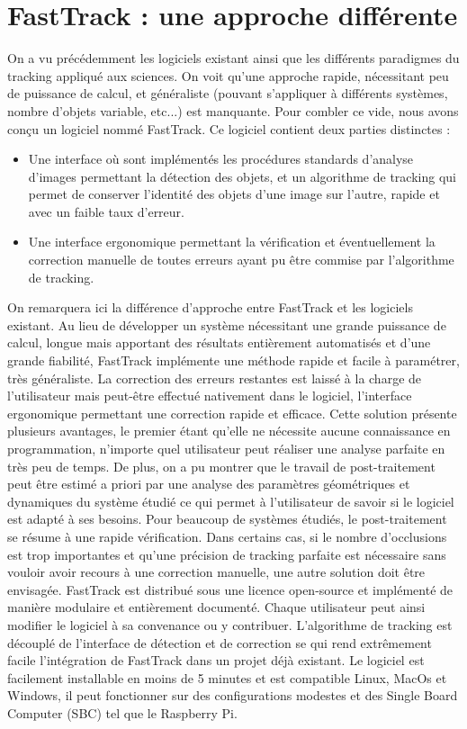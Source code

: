 	\section{FastTrack : une approche différente}
  On a vu précédemment les logiciels existant ainsi que les différents paradigmes du tracking appliqué aux sciences. On voit qu'une approche rapide, nécessitant peu de puissance de calcul, et généraliste (pouvant s'appliquer à différents systèmes, nombre d'objets variable, etc...) est manquante.
	Pour combler ce vide, nous avons conçu un logiciel nommé FastTrack. Ce logiciel contient deux parties distinctes :
	\begin{itemize}
		\item Une interface où sont implémentés les procédures standards d'analyse d'images permettant la détection des objets, et un algorithme de tracking qui permet de conserver l'identité des objets d'une image sur l'autre, rapide et avec un faible taux d'erreur.
		\item Une interface ergonomique permettant la vérification et éventuellement la correction manuelle de toutes erreurs ayant pu être commise par l’algorithme de tracking.
	\end{itemize}
	On remarquera ici la différence d'approche entre FastTrack et les logiciels existant. Au lieu de développer un système nécessitant une grande puissance de calcul, longue mais apportant des résultats entièrement automatisés et d'une grande fiabilité, FastTrack implémente une méthode rapide et facile à paramétrer, très généraliste. La correction des erreurs restantes est laissé à la charge de l'utilisateur mais peut-être effectué nativement dans le logiciel, l'interface ergonomique permettant une correction rapide et efficace. 
	Cette solution présente plusieurs avantages, le premier étant qu'elle ne nécessite aucune connaissance en programmation, n'importe quel utilisateur peut réaliser une analyse parfaite en très peu de temps. De plus, on a pu montrer que le travail de post-traitement peut être estimé a priori par une analyse des paramètres géométriques et dynamiques du système étudié ce qui permet à l'utilisateur de savoir si le logiciel est adapté à ses besoins. Pour beaucoup de systèmes étudiés, le post-traitement se résume à une rapide vérification. Dans certains cas, si le nombre d'occlusions est trop importantes et qu'une précision de tracking parfaite est nécessaire sans vouloir avoir recours à une correction manuelle, une autre solution doit être envisagée.
\medbreak
	FastTrack est distribué sous une licence open-source et implémenté de manière modulaire et entièrement documenté. Chaque utilisateur peut ainsi modifier le logiciel à sa convenance ou y contribuer. L'algorithme de tracking est découplé de l'interface de détection et de correction se qui rend extrêmement facile l'intégration de FastTrack dans un projet déjà existant. Le logiciel est facilement installable en moins de 5 minutes et est compatible Linux, MacOs et Windows, il peut fonctionner sur des configurations modestes et des Single Board Computer (SBC) tel que le Raspberry Pi.


